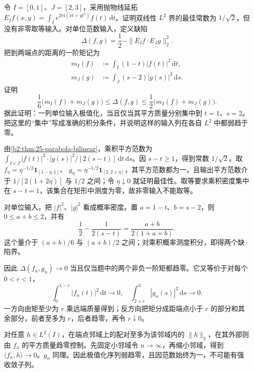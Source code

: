 \begin{optionalexercise}\label{b2:ex:25-new-4}
令 \(I=[0,1]\)、\(J=[2,3]\)，采用抛物线延拓
\(E_If(x,y)=\int_I e^{2\pi\mathrm i(xt+yt^2)}f(t)\,\mathrm dt\)。证明双线性 \(L^2\) 界的最佳常数为 \(1/\sqrt2\)，但没有非零取等输入。对单位范数输入，定义缺陷
\[
 \Delta(f,g)=\frac12-\|E_If\cdot E_Jg\|_2^2.
\]
把到两端点的距离的一阶矩记为
\[
 \begin{aligned}
 m_I(f)&\coloneqq\int_I(1-t)|f(t)|^2\,\mathrm dt,\\
 m_J(g)&\coloneqq\int_J(s-2)|g(s)|^2\,\mathrm ds.
 \end{aligned}
\]
证明
\[
 \frac16\bigl(m_I(f)+m_J(g)\bigr)
 \leq\Delta(f,g)
 \leq\frac12\bigl(m_I(f)+m_J(g)\bigr).
\]
据此证明：一列单位输入极值化，当且仅当其平方质量分别集中到 \(t=1\)、\(s=2\)。把这里的“集中”写成准确的积分条件，并说明这样的输入列在各自 \(L^2\) 中都弱趋于零。
\end{optionalexercise}
\begin{solution}
由\cref{b2:thm:25-parabola-bilinear}，乘积平方范数为
\(\int_{I\times J}|f(t)|^2\cdot|g(s)|^2/[2(s-t)]\,\mathrm dt\,\mathrm ds\)。因 \(s-t\geq1\)，得到常数 \(1/\sqrt2\)。取
\(f_\eta=\eta^{-1/2}\mathbf1_{[1-\eta,1]}\)、
\(g_\eta=\eta^{-1/2}\mathbf1_{[2,2+\eta]}\)，其平方范数都为一，且输出平方范数介于 \(1/[2(1+2\eta)]\) 与 \(1/2\) 之间；令 \(\eta\downarrow0\) 就证明最佳性。取等要求乘积密度集中在 \(s-t=1\)，该集合在矩形中测度为零，故非零输入不能取等。

对单位输入，把 \(|f|^2\)、\(|g|^2\) 看成概率密度。置 \(a=1-t\)、\(b=s-2\)，则 \(0\leq a+b\leq2\)，并有
\[
 \frac12-\frac1{2(s-t)}=\frac{a+b}{2(1+a+b)}.
\]
这个量介于 \((a+b)/6\) 与 \((a+b)/2\) 之间；对乘积概率测度积分，即得两个缺陷界。

因此 \(\Delta(f_n,g_n)\to0\) 当且仅当题中的两个非负一阶矩都趋零。它又等价于对每个 \(0<r<1\)，
\[
 \int_0^{1-r}|f_n(t)|^2\,\mathrm dt\longrightarrow0,
 \quad \int_{2+r}^3|g_n(s)|^2\,\mathrm ds\longrightarrow0.
\]
一方向由矩至少为 \(r\) 乘远端质量得到；反方向把矩分成距端点小于 \(r\) 的部分和其余部分，前者至多为 \(r\)，后者趋零，再令 \(r\downarrow0\)。

对任意 \(h\in L^2(I)\)，在端点邻域上的配对至多为该邻域内的 \(\|h\|_2\)，在其外部则由 \(f_n\) 的平方质量趋零控制。先固定小邻域令 \(n\to\infty\)，再缩小邻域，得到 \(\langle f_n,h\rangle\to0\)。\(g_n\) 同理。因此极值化序列弱趋零，且因范数始终为一，不可能有强收敛子列。
\end{solution}

